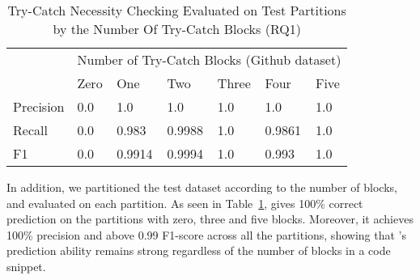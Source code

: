 

\begin{table}[t]%
  \caption{Try-Catch Necessity Checking Evaluated on Test Partitions by the Number Of Try-Catch Blocks (RQ1) }
  \vspace{-12pt}
  \small
	\begin{center}
		\renewcommand{\arraystretch}{1}
		\begin{tabular}{| p{1.0cm}<{\centering} | p{0.7cm}<{\centering} | p{0.7cm}<{\centering}| p{0.7cm}<{\centering} | p{0.7cm}<{\centering} | p{0.7cm}<{\centering} | p{0.7cm}<{\centering} | }
		  \hline
			\multirow{2}{*}{} & \multicolumn{6}{c|}{Number of Try-Catch Blocks (Github dataset)} \\
			\cline{2-7}
			  & Zero  & One & Two & Three & Four & Five\\
			\hline
			Precision & 0.0 &  1.0 & 1.0 & 1.0 & 1.0 & 1.0\\
			\hline
			Recall   & 0.0 &  0.983 & 0.9988 & 1.0 & 0.9861 & 1.0\\
			\hline
			F1   & 0.0  &  0.9914 & 0.9994 & 1.0 & 0.993 & 1.0\\
			\hline
		\end{tabular}
		\label{tab:rq1-detailed-result}
	\end{center}
\end{table}

In addition, we partitioned the test dataset according to the number
of  blocks, and evaluated {\xblock} on each
partition. As seen in Table~\ref{tab:rq1-detailed-result}, {\xblock}
gives 100\% correct prediction on the partitions with zero, three and
five  blocks. Moreover, it achieves 100\% precision
and above 0.99 F1-score across all the partitions, showing that
{\xblock}'s prediction ability remains strong regardless of the number
of  blocks in a code snippet.



